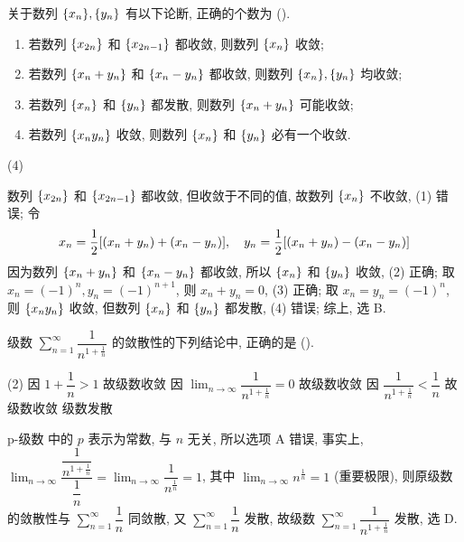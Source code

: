 \begin{example}
    关于数列 $\qty{x_n},\qty{y_n}$ 有以下论断, 正确的个数为 (\quad).
    \begin{enumerate}[label=(\arabic{*})]
        \item 若数列 $\qty{x_{2n}}$ 和 $\qty{x_{2n-1}}$ 都收敛, 则数列 $\qty{x_n}$ 收敛;
        \item 若数列 $\qty{x_n+y_n}$ 和 $\qty{x_n-y_n}$ 都收敛, 则数列 $\qty{x_n}, \qty{y_n}$ 均收敛;
        \item 若数列 $\qty{x_{n}}$ 和 $\qty{y_{n}}$ 都发散, 则数列 $\qty{x_n+y_n}$ 可能收敛;
        \item 若数列 $\qty{x_ny_n}$ 收敛, 则数列 $\qty{x_n}$ 和 $\qty{y_n}$ 必有一个收敛.
    \end{enumerate}
    \begin{tasks}(4)
    \end{tasks}
\end{example}
\begin{solution}
    数列 $\qty{x_{2n}}$ 和 $\qty{x_{2n-1}}$ 都收敛, 但收敛于不同的值, 故数列 $\qty{x_n}$ 不收敛, (1) 错误;
    令 $$
        x_n=\dfrac{1}{2}\qty[(x_n+y_n)+(x_n-y_n)],\quad y_n=\dfrac{1}{2}\qty[(x_n+y_n)-(x_n-y_n)]
    $$
    因为数列 $\qty{x_n+y_n}$ 和 $\qty{x_n-y_n}$ 都收敛, 所以 $\qty{x_n}$ 和 $\qty{y_n}$ 收敛, (2) 正确;
    取 $x_n=(-1)^n, y_n=(-1)^{n+1}$, 则 $x_n+y_n=0$, (3) 正确;
    取 $x_n=y_n=(-1)^n$, 则 $\qty{x_ny_n}$ 收敛, 但数列 $\qty{x_{n}}$ 和 $\qty{y_{n}}$ 都发散, (4) 错误;
    综上, 选 B.
\end{solution}

\begin{example}
    级数 $\displaystyle\sum_{n=1}^{\infty}\dfrac{1}{n^{1+\frac{1}{n}}}$ 的敛散性的下列结论中, 正确的是 (\quad).
    \begin{tasks}(2)
        \task 因 $1+\dfrac{1}{n}>1$ 故级数收敛
        \task 因 $\displaystyle\lim_{n\to\infty}\dfrac{1}{n^{1+\frac{1}{n}}}=0$ 故级数收敛
        \task 因 $\dfrac{1}{n^{1+\frac{1}{n}}}<\dfrac{1}{n}$ 故级数收敛
        \task 级数发散
    \end{tasks}
\end{example}
\begin{solution}
    p-级数 中的 $p$ 表示为常数, 与 $n$ 无关, 所以选项 A 错误, 事实上, $\displaystyle \lim_{n\to\infty}\dfrac{\dfrac{1}{n^{1+\frac{1}{n}}}}{\dfrac{1}{n}}=\lim_{n\to\infty}\dfrac{1}{n^{\frac{1}{n}}}=1$, 其中 $\displaystyle\lim_{n\to\infty}n^{\frac{1}{n}}=1$ (重要极限),
    则原级数的敛散性与 $\displaystyle\sum_{n=1}^{\infty}\dfrac{1}{n}$ 同敛散, 又 $\displaystyle\sum_{n=1}^{\infty}\dfrac{1}{n}$ 发散, 故级数 $\displaystyle\sum_{n=1}^{\infty}\dfrac{1}{n^{1+\frac{1}{n}}}$ 发散, 选 D.
\end{solution}

